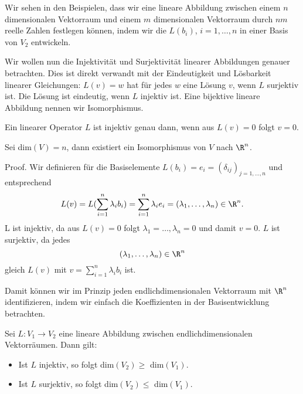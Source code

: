 \documentclass[letterpaper,10pt,english]{jupyterBook}
\begin{document}
Wir sehen in den Beispielen, dass wir eine lineare Abbildung zwischen einem \(n\) dimensionalen Vektorraum und einem \(m\) dimensionalen Vektorraum durch \(nm\) reelle Zahlen festlegen können, indem wir die \(L(b_i)\), \(i=1,\ldots,n\) in einer Basis von \(V_2\) entwickeln.

Wir wollen nun die Injektivität und Surjektivität linearer Abbildungen genauer betrachten. Dies ist direkt verwandt mit der Eindeutigkeit und Lösbarkeit linearer Gleichungen: \(L(v) = w\) hat für jedes \(w\) eine Lösung \(v\), wenn \(L\) surjektiv ist. Die Lösung ist eindeutig, wenn \(L\) injektiv ist. Eine bijektive lineare Abbildung nennen wir Isomorphismus.
\label{vektorraeume/LineareAbb:lemma-4}
\begin{lemma}{}{}



Ein linearer Operator \(L\) ist injektiv genau dann, wenn aus \(L(v) = 0\) folgt \(v=0\).
\end{lemma}
\label{vektorraeume/LineareAbb:theorem-5}
\begin{theorem}{}{}



Sei dim\((V) =n\), dann existiert ein Isomorphismus von \(V\) nach \(\R^n\).
\end{theorem}

\begin{emphBox}{}{}
Proof.  Wir definieren für die Basiselemente \(L(b_i) = e_i = (\delta_{ij})_{j=1,\ldots,n}\) und entsprechend
\begin{equation*}
 L(v) = L(\sum_{i=1}^n \lambda_i b_i) = \sum_{i=1}^n \lambda_i e_i = (\lambda_1, \ldots, \lambda_n) \in \R^n .
\end{equation*}
L ist injektiv, da aus \(L(v) = 0\) folgt \(\lambda_1=\ldots,\lambda_n = 0\) und damit \(v=0\). \(L\) ist surjektiv, da jedes
\begin{equation*}
 (\lambda_1, \ldots, \lambda_n) \in \R^n\end{equation*}
gleich \(L(v)\) mit \(v = \sum_{i=1}^n \lambda_i b_i\) ist.
\end{emphBox}

Damit können wir im Prinzip jeden endlichdimensionalen Vektorraum mit \(\R^n\) identifizieren, indem wir einfach die Koeffizienten in der Basisentwicklung betrachten.
\label{vektorraeume/LineareAbb:theorem-6}
\begin{theorem}{}{}



Sei \(L: V_1 \rightarrow V_2\) eine lineare Abbildung zwischen endlichdimensionalen Vektorräumen. Dann gilt:
\begin{itemize}
\item {} 
Ist \(L\) injektiv, so folgt dim\((V_2) \geq \) dim\((V_1)\).

\item {} 
Ist \(L\) surjektiv, so folgt dim\((V_2) \leq \) dim\((V_1)\).

\end{itemize}
\end{theorem}
\end{document}
